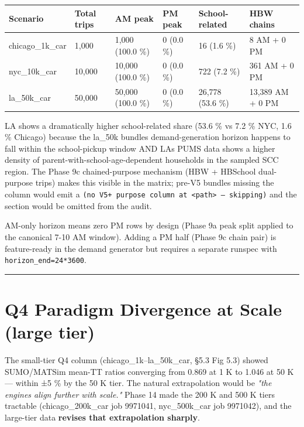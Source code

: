 \begin{longtable}[]{@{}llllll@{}}
\toprule\noalign{}
Scenario & Total trips & AM peak & PM peak & School-related & HBW
chains \\
\midrule\noalign{}
\endhead
\bottomrule\noalign{}
\endlastfoot
chicago\_1k\_car & 1,000 & 1,000 (100.0 \%) & 0 (0.0 \%) & 16 (1.6 \%) &
8 AM + 0 PM \\
nyc\_10k\_car & 10,000 & 10,000 (100.0 \%) & 0 (0.0 \%) & 722 (7.2 \%) &
361 AM + 0 PM \\
la\_50k\_car & 50,000 & 50,000 (100.0 \%) & 0 (0.0 \%) & 26,778 (53.6
\%) & 13,389 AM + 0 PM \\
\end{longtable}

LA shows a dramatically higher school-related share (53.6 \% vs 7.2 \%
NYC, 1.6 \% Chicago) because the la\_50k bundle\textquotesingle s
demand-generation horizon happens to fall within the school-pickup
window AND LA\textquotesingle s PUMS data shows a higher density of
parent-with-school-age-dependent households in the sampled SCC region.
The Phase 9c chained-purpose mechanism (HBW + HBSchool dual-purpose
trips) makes this visible in the matrix; pre-V5 bundles missing the
column would emit a
\texttt{(no\ V5+\ purpose\ column\ at\ \textless{}path\textgreater{}\ —\ skipping)}
and the section would be omitted from the audit.

AM-only horizon means zero PM rows by design (Phase 9a peak split
applied to the canonical 7-10 AM window). Adding a PM half (Phase 9c
chain pair) is feature-ready in the demand generator but requires a
separate runspec with \texttt{horizon\_end=24*3600}.

\begin{center}\rule{0.5\linewidth}{0.5pt}\end{center}

\section{Q4 Paradigm Divergence at Scale (large
tier)}\label{562-q4-paradigm-divergence-at-scale-large-tier}

The small-tier Q4 column (chicago\_1k--la\_50k\_car, §5.3 Fig 5.3)
showed SUMO/MATSim mean-TT ratios converging from 0.869 at 1 K to 1.046
at 50 K --- within ±5 \% by the 50 K tier. The natural extrapolation
would be \emph{"the engines align further with scale."} Phase 14 made
the 200 K and 500 K tiers tractable (chicago\_200k\_car job 9971041,
nyc\_500k\_car job 9971042), and the large-tier data \textbf{revises
that extrapolation sharply}.

